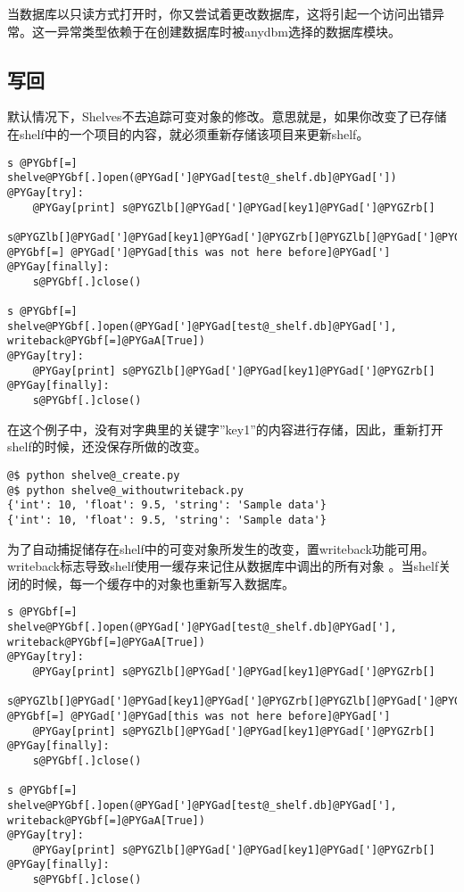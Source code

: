 \documentclass[letterpaper,10pt,english]{manual}
\begin{document}
当数据库以只读方式打开时，你又尝试着更改数据库，这将引起一个访问出错异常。这一异常类型依赖于在创建数据库时被anydbm选择的数据库模块。


\subsection{写回}

默认情况下，Shelves不去追踪可变对象的修改。意思就是，如果你改变了已存储在shelf中的一个项目的内容，就必须重新存储该项目来更新shelf。

\begin{Verbatim}[commandchars=@\[\]]
s @PYGbf[=] shelve@PYGbf[.]open(@PYGad[']@PYGad[test@_shelf.db]@PYGad['])
@PYGay[try]:
    @PYGay[print] s@PYGZlb[]@PYGad[']@PYGad[key1]@PYGad[']@PYGZrb[]
    s@PYGZlb[]@PYGad[']@PYGad[key1]@PYGad[']@PYGZrb[]@PYGZlb[]@PYGad[']@PYGad[new@_value]@PYGad[']@PYGZrb[] @PYGbf[=] @PYGad[']@PYGad[this was not here before]@PYGad[']
@PYGay[finally]:
    s@PYGbf[.]close()

s @PYGbf[=] shelve@PYGbf[.]open(@PYGad[']@PYGad[test@_shelf.db]@PYGad['], writeback@PYGbf[=]@PYGaA[True])
@PYGay[try]:
    @PYGay[print] s@PYGZlb[]@PYGad[']@PYGad[key1]@PYGad[']@PYGZrb[]
@PYGay[finally]:
    s@PYGbf[.]close()
\end{Verbatim}

在这个例子中，没有对字典里的关键字''key1''的内容进行存储，因此，重新打开shelf的时候，还没保存所做的改变。

\begin{Verbatim}[commandchars=@\[\]]
@$ python shelve@_create.py
@$ python shelve@_withoutwriteback.py
{'int': 10, 'float': 9.5, 'string': 'Sample data'}
{'int': 10, 'float': 9.5, 'string': 'Sample data'}
\end{Verbatim}

为了自动捕捉储存在shelf中的可变对象所发生的改变，置writeback功能可用。writeback标志导致shelf使用一缓存来记住从数据库中调出的所有对象 。当shelf关闭的时候，每一个缓存中的对象也重新写入数据库。

\begin{Verbatim}[commandchars=@\[\]]
s @PYGbf[=] shelve@PYGbf[.]open(@PYGad[']@PYGad[test@_shelf.db]@PYGad['], writeback@PYGbf[=]@PYGaA[True])
@PYGay[try]:
    @PYGay[print] s@PYGZlb[]@PYGad[']@PYGad[key1]@PYGad[']@PYGZrb[]
    s@PYGZlb[]@PYGad[']@PYGad[key1]@PYGad[']@PYGZrb[]@PYGZlb[]@PYGad[']@PYGad[new@_value]@PYGad[']@PYGZrb[] @PYGbf[=] @PYGad[']@PYGad[this was not here before]@PYGad[']
    @PYGay[print] s@PYGZlb[]@PYGad[']@PYGad[key1]@PYGad[']@PYGZrb[]
@PYGay[finally]:
    s@PYGbf[.]close()

s @PYGbf[=] shelve@PYGbf[.]open(@PYGad[']@PYGad[test@_shelf.db]@PYGad['], writeback@PYGbf[=]@PYGaA[True])
@PYGay[try]:
    @PYGay[print] s@PYGZlb[]@PYGad[']@PYGad[key1]@PYGad[']@PYGZrb[]
@PYGay[finally]:
    s@PYGbf[.]close()
\end{Verbatim}
\end{document}
